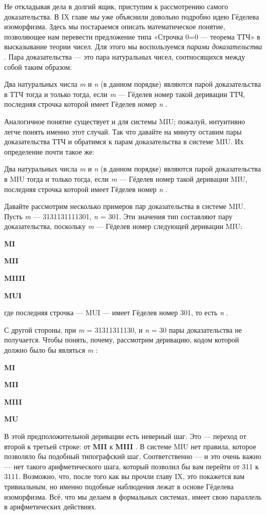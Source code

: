 \documentclass[../main.tex]{subfiles}
\begin{document}
Не откладывая дела в долгий ящик, приступим к рассмотрению самого доказательства. В IX главе мы уже объяснили довольно подробно идею Гёделева изоморфизма. Здесь мы постараемся описать математическое понятие, позволяющее нам перевести предложение типа «Строчка 0=0 --- теорема ТТЧ» в высказывание теории чисел. Для этого мы воспользуемся \emph{парами доказательства} . Пара доказательства --- это пара натуральных чисел, соотносящихся между собой таким образом:

Два натуральных числа \emph{m} и \emph{n} (в данном порядке) являются парой доказательства в ТТЧ тогда и только тогда, если \emph{m} --- Гёделев номер такой деривации ТТЧ, последняя строчка которой имеет Гёделев номер \emph{n} .

Аналогичное понятие существует и для системы MIU; пожалуй, интуитивно легче понять именно этот случай. Так что давайте на минуту оставим пары доказательства ТТЧ и обратимся к парам доказательства в системе MIU. Их определение почти такое же:

Два натуральных числа \emph{m} и \emph{n} (в данном порядке) являются парой доказательства в MIU тогда и только тогда, если \emph{m} --- Гёделев номер такой деривации MIU, последняя строчка которой имеет Гёделев номер \emph{n} .

Давайте рассмотрим несколько примеров пар доказательства в системе MIU. Пусть \emph{m} --- 3131131111301, \emph{n} = 301. Эти значения тип составляют пару доказательства, поскольку \emph{m} --- Гёделев номер следующей деривации MIU:

\textbf{MI}

\textbf{MII}

\textbf{MIIII}

\textbf{MUI}

где последняя строчка --- MUI --- имеет Гёделев номер 301, то есть \emph{n} .

С другой стороны, при \emph{m} = 31311311130, и \emph{n} = 30 пары доказательства не получается. Чтобы понять, почему, рассмотрим деривацию, кодом которой должно было бы являться \emph{m} :

\textbf{MI}

\textbf{MII}

\textbf{MIII}

\textbf{MU}

В этой предположительной деривации есть неверный шаг. Это --- переход от второй к третьей строке: от \textbf{MII} к \textbf{MIII} . В системе MIU нет правила, которое позволяло бы подобный типографский шаг. Соответственно --- и это очень важно --- нет такого арифметического шага, который позволил бы вам перейти от 311 к 3111. Возможно, что, после того как вы прочли главу IX, это покажется вам тривиальным, но именно подобные наблюдения лежат в основе Гёделева изоморфизма. Всё, что мы делаем в формальных системах, имеет свою параллель в арифметических действиях.
\end{document}
